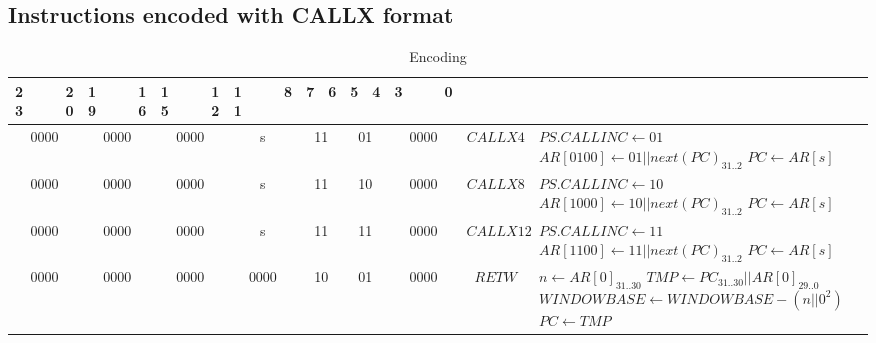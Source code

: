 \newpage

\subsection{Instructions encoded with CALLX format}
\begin{longtable}{llllllllllllllllllllllll  p{1cm}  p{6cm} | }
	\caption{Encoding\label{long}}\\
	23 & & & 20 & 19 & & & 16 & 15 & & & 12 & 11 & & & 8 & 7 & 6 & 5 & 4 & 3 & & & 0 & & \multicolumn{1}{c}{}\\
	\hline
	\multicolumn{4}{|c|}{0000} & \multicolumn{4}{c|}{0000} & \multicolumn{4}{c|}{0000} & \multicolumn{4}{c|}{s} & \multicolumn{2}{c|}{11} & \multicolumn{2}{c|}{01} & \multicolumn{4}{c|}{0000} & \multicolumn{1}{c|}{$CALLX4$} & $PS.CALLINC \leftarrow {01}$ \newline $AR[0100] \leftarrow 01||next(PC)_{31..2}$ \newline $PC \leftarrow AR[s]$\\ \hline
	\multicolumn{4}{|c|}{0000} & \multicolumn{4}{c|}{0000} & \multicolumn{4}{c|}{0000} & \multicolumn{4}{c|}{s} & \multicolumn{2}{c|}{11} & \multicolumn{2}{c|}{10} & \multicolumn{4}{c|}{0000} & \multicolumn{1}{c|}{$CALLX8$} & $PS.CALLINC \leftarrow {10}$ \newline $AR[1000] \leftarrow 10||next(PC)_{31..2}$ \newline $PC \leftarrow AR[s]$\\ \hline
	\multicolumn{4}{|c|}{0000} & \multicolumn{4}{c|}{0000} & \multicolumn{4}{c|}{0000} & \multicolumn{4}{c|}{s} & \multicolumn{2}{c|}{11} & \multicolumn{2}{c|}{11} & \multicolumn{4}{c|}{0000} & \multicolumn{1}{c|}{$CALLX12$} & $PS.CALLINC \leftarrow {11}$ \newline $AR[1100] \leftarrow 11||next(PC)_{31..2}$ \newline $PC \leftarrow AR[s]$\\ \hline
	\multicolumn{4}{|c|}{0000} & \multicolumn{4}{c|}{0000} & \multicolumn{4}{c|}{0000} & \multicolumn{4}{c|}{0000} & \multicolumn{2}{c|}{10} & \multicolumn{2}{c|}{01} & \multicolumn{4}{c|}{0000} & \multicolumn{1}{c|}{$RETW$} & $n \leftarrow AR[0]_{31..30}$ \newline $TMP \leftarrow PC_{31..30}||AR[0]_{29..0}$ \newline $WINDOWBASE \leftarrow WINDOWBASE - (n||0^2)$ \newline $PC \leftarrow TMP$\\ \hline
\end{longtable}

